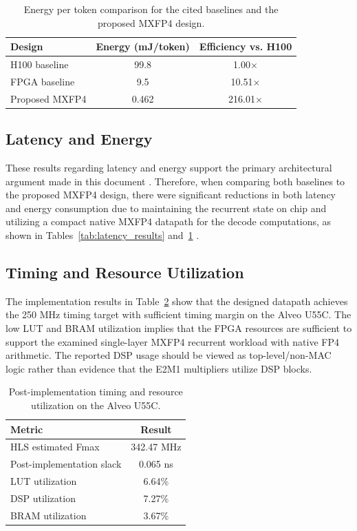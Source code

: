 ﻿\documentclass[conference]{IEEEtran}
\begin{document}
\begin{table}[t]
\centering
\caption{Energy per token comparison for the cited baselines and the proposed MXFP4 design.}
\label{tab:energy_results}
\footnotesize
\renewcommand{\arraystretch}{1.0}
\setlength{\tabcolsep}{6pt}
\begin{tabularx}{\linewidth}{Xcc}
\toprule
Design & Energy (mJ/token) & Efficiency vs. H100 \\
\midrule
H100 baseline & 99.8 & 1.00$\times$ \\
FPGA baseline & 9.5 & 10.51$\times$ \\
Proposed MXFP4 & 0.462 & 216.01$\times$ \\
\bottomrule
\end{tabularx}
\end{table}

\subsection{Latency and Energy}

These results regarding latency and energy support the primary architectural argument made in this document \cite{b5,b10}. Therefore, when comparing both baselines to the proposed MXFP4 design, there were significant reductions in both latency and energy consumption due to maintaining the recurrent state on chip and utilizing a compact native MXFP4 datapath for the decode computations, as shown in Tables~\ref{tab:latency_results} and~\ref{tab:energy_results} \cite{b10,b12}.


\subsection{Timing and Resource Utilization}
The implementation results in Table~\ref{tab:resource_results} show that the designed datapath achieves the 250 MHz timing target with sufficient timing margin on the Alveo U55C. The low LUT and BRAM utilization implies that the FPGA resources are sufficient to support the examined single-layer MXFP4 recurrent workload with native FP4 arithmetic. The reported DSP usage should be viewed as top-level/non-MAC logic rather than evidence that the E2M1 multipliers utilize DSP blocks.

\begin{table}[t]
\centering
\caption{Post-implementation timing and resource utilization on the Alveo U55C.}
\label{tab:resource_results}
\footnotesize
\renewcommand{\arraystretch}{1.0}
\setlength{\tabcolsep}{6pt}
\begin{tabularx}{\linewidth}{Xc}
\toprule
Metric & Result \\
\midrule
HLS estimated Fmax & 342.47 MHz \\
Post-implementation slack & 0.065 ns \\
LUT utilization & 6.64\% \\
DSP utilization & 7.27\% \\
BRAM utilization & 3.67\% \\
\bottomrule
\end{tabularx}
\end{table}
\end{document}
